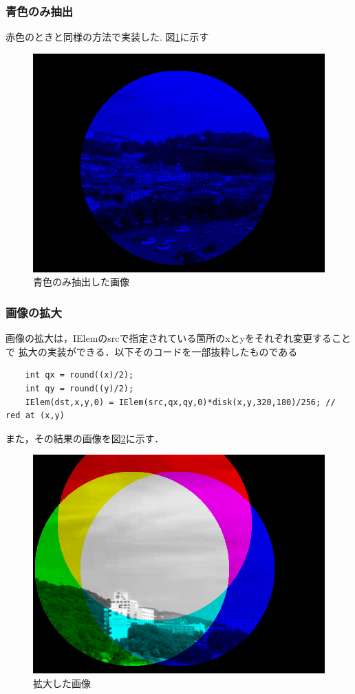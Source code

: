 \documentclass[11pt]{jarticle}
\begin{document}
\subsubsection{青色のみ抽出}
赤色のときと同様の方法で実装した.
図\ref{c.jpg}に示す

\begin{figure}[htbp]
    \centering
    \includegraphics[scale=.2]{c.jpg}
    \caption{青色のみ抽出した画像}
    \label{c.jpg}
\end{figure}

\subsubsection{画像の拡大}
画像の拡大は，IElemのsrcで指定されている箇所のxとyをそれぞれ変更することで
拡大の実装ができる．以下そのコードを一部抜粋したものである
\begin{verbatim}
    int qx = round((x)/2);
    int qy = round((y)/2); 
    IElem(dst,x,y,0) = IElem(src,qx,qy,0)*disk(x,y,320,180)/256; // red at (x,y)
\end{verbatim}
また，その結果の画像を図\ref{kakudai.jpg}に示す．
\begin{figure}[htbp]
    \centering
    \includegraphics[scale=.2]{kakudai.jpg}
    \caption{拡大した画像}
    \label{kakudai.jpg}
\end{figure}
\end{document}
